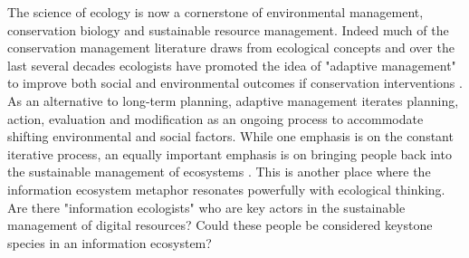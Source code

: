  The science of ecology is now a cornerstone of environmental management, conservation biology and sustainable resource management. Indeed much of the conservation management literature draws from ecological concepts and over the last several decades ecologists have promoted the idea of "adaptive management" to improve both social and environmental outcomes if conservation interventions \citep{holling_1978,leopold_1963}. As an alternative to long-term planning, adaptive management iterates planning, action, evaluation and modification as an ongoing process to accommodate shifting environmental and social factors. While one emphasis is on the constant iterative process, an equally important emphasis is on bringing people back into the sustainable management of ecosystems \citep{berkes_2000,holling_2002}. This is another place where the information ecosystem metaphor resonates powerfully with ecological thinking. Are there "information ecologists" who are key actors in the sustainable management of digital resources? Could these people be considered keystone species in an information ecosystem?